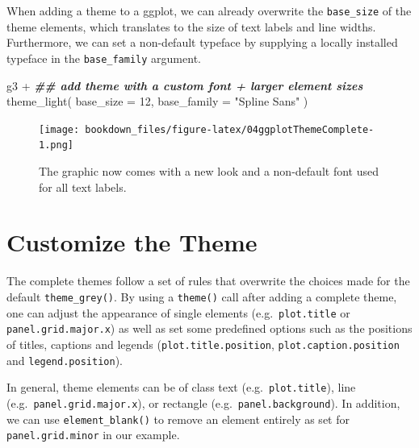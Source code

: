 \documentclass[
]{krantz}
\makeatletter
\newenvironment{Shaded}{\begin{snugshade}}{\end{snugshade}}
\newcommand{\AttributeTok}[1]{\textcolor[rgb]{0.61,0.61,0.61}{#1}}
\newcommand{\DecValTok}[1]{\textcolor[rgb]{0.06,0.06,0.06}{#1}}
\newcommand{\DocumentationTok}[1]{\textcolor[rgb]{0.37,0.37,0.37}{\textbf{\textit{#1}}}}
\newcommand{\FunctionTok}[1]{\textcolor[rgb]{0,0,0}{#1}}
\newcommand{\NormalTok}[1]{#1}
\newcommand{\SpecialCharTok}[1]{\textcolor[rgb]{0,0,0}{#1}}
\newcommand{\StringTok}[1]{\textcolor[rgb]{0.5,0.5,0.5}{#1}}
\newenvironment{kframe}{%
\medskip{}
\setlength{\fboxsep}{.8em}
 \def\at@end@of@kframe{}%
 \ifinner\ifhmode%
  \def\at@end@of@kframe{\end{minipage}}%
  \begin{minipage}{\columnwidth}%
 \fi\fi%
 \def\FrameCommand##1{\hskip\@totalleftmargin \hskip-\fboxsep
 \colorbox{shadecolor}{##1}\hskip-\fboxsep
     \hskip-\linewidth \hskip-\@totalleftmargin \hskip\columnwidth}%
 \MakeFramed {\advance\hsize-\width
   \@totalleftmargin\z@ \linewidth\hsize
   \@setminipage}}%
 {\par\unskip\endMakeFramed%
 \at@end@of@kframe}
\renewenvironment{Shaded}{\begin{kframe}}{\end{kframe}}
\makeatother
\begin{document}
When adding a theme to a ggplot, we can already overwrite the \texttt{base\_size} of the theme elements, which translates to the size of text labels and line widths. Furthermore, we can set a non-default typeface by supplying a locally installed typeface in the \texttt{base\_family} argument.

\begin{Shaded}
\begin{Highlighting}[]
\NormalTok{g3 }\SpecialCharTok{+}
  \DocumentationTok{\#\# add theme with a custom font + larger element sizes}
  \FunctionTok{theme\_light}\NormalTok{(}
    \AttributeTok{base\_size =} \DecValTok{12}\NormalTok{, }\AttributeTok{base\_family =} \StringTok{"Spline Sans"}
\NormalTok{  )}
\end{Highlighting}
\end{Shaded}

\begin{figure}
\centering
\texttt{[image: bookdown\_files/figure-latex/04ggplotThemeComplete-1.png]}
\caption{\label{fig:04ggplotThemeComplete}The graphic now comes with a new look and a non-default font used for all text labels.}
\end{figure}

\hypertarget{custom-theming}{%
\section{Customize the Theme}\label{custom-theming}}

The complete themes follow a set of rules that overwrite the choices made for the default \texttt{theme\_grey()}. By using a \texttt{theme()} call after adding a complete theme, one can adjust the appearance of single elements (e.g.~\texttt{plot.title} or \texttt{panel.grid.major.x}) as well as set some predefined options such as the positions of titles, captions and legends (\texttt{plot.title.position}, \texttt{plot.caption.position} and \texttt{legend.position}).

In general, theme elements can be of class text (e.g.~\texttt{plot.title}), line (e.g.~\texttt{panel.grid.major.x}), or rectangle (e.g.~\texttt{panel.background}). In addition, we can use \texttt{element\_blank()} to remove an element entirely as set for \texttt{panel.grid.minor} in our example.
\end{document}
